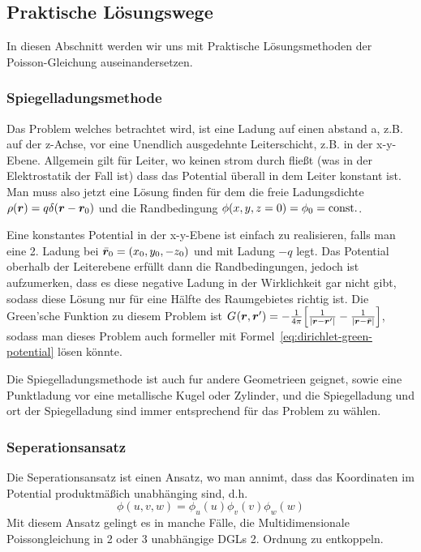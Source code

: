 \subsection{Praktische Lösungswege}%
\label{sub:spiegelladungsmethode}
In diesen Abschnitt werden wir uns mit Praktische Lösungsmethoden der
Poisson-Gleichung auseinandersetzen.

\subsubsection{Spiegelladungsmethode}%
Das Problem welches betrachtet wird, ist eine Ladung auf einen abstand a, z.B.
auf der z-Achse, vor eine Unendlich ausgedehnte Leiterschicht, z.B. in der 
x-y-Ebene. Allgemein gilt für Leiter, wo keinen strom durch fließt (was
in der Elektrostatik der Fall ist) dass das Potential überall in dem Leiter
konstant ist. Man muss also jetzt eine Lösung finden für dem die freie 
Ladungsdichte $\rho(\vb*r)=q\delta(\vb*r-\vb*r_0)$ und die Randbedingung 
$\phi(x,y,z=0)=\phi_0=\mathrm{const.}$. 

Eine konstantes Potential in der x-y-Ebene
ist einfach zu realisieren, falls man eine 2. Ladung bei $\bar{\vb*r}_0=
(x_0,y_0,-z_0)$ und mit Ladung $-q$ legt. Das Potential oberhalb der 
Leiterebene erfüllt dann die Randbedingungen, jedoch ist aufzumerken, dass
es diese negative Ladung in der Wirklichkeit gar nicht gibt, sodass diese 
Lösung nur für eine Hälfte des Raumgebietes richtig ist. Die Green'sche
Funktion zu diesem Problem ist $G_{}(\vb*r,\vb*r')=-\frac{1}{4\pi} \qty[\frac{1}{\abs{\vb*r-\vb*r'}}-\frac{1}{\abs{\vb*r-\bar{\vb*r}}}]$, sodass man dieses Problem auch formeller mit 
Formel~\ref{eq:dirichlet-green-potential} lösen könnte.

Die Spiegelladungsmethode ist auch fur andere Geometrieen geignet, sowie
eine Punktladung vor eine metallische Kugel oder Zylinder, und die
Spiegelladung und ort der Spiegelladung sind immer entsprechend für das
Problem zu wählen.

\subsubsection{Seperationsansatz}%
Die Seperationsansatz ist einen Ansatz, wo man annimt, dass das Koordinaten
im Potential produktmäßich unabhänging sind, d.h.
\begin{equation*}
  \phi(u,v,w)=\phi_u(u)\phi_v(v)\phi_w(w)
\end{equation*}
Mit diesem Ansatz gelingt es in manche Fälle, die Multidimensionale 
Poissongleichung in 2 oder 3 unabhängige DGLs 2. Ordnung zu entkoppeln.

